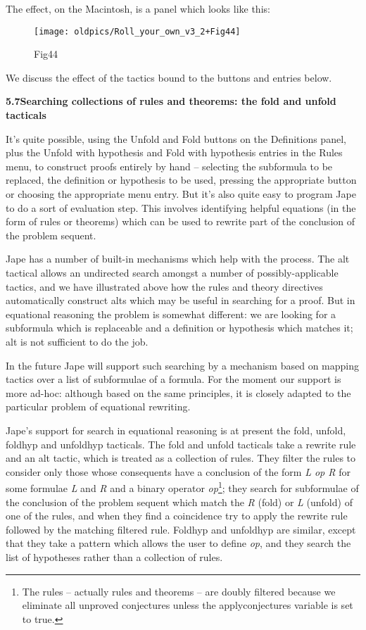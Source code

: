 \documentclass[11pt]{book}
\newcommand{\tab}{\hspace{5mm}}
\begin{document}
The effect, on the Macintosh, is a panel which looks like this:

\begin{figure}[htbp] \begin{center} \texttt{[image: oldpics/Roll\_your\_own\_v3\_2+Fig44]} \caption{Fig44} \end{center} \end{figure}


We discuss the effect of the tactics bound to the buttons and entries below.


\textbf{5.7\tab Searching collections of rules and theorems: the fold and unfold tacticals}


It's quite possible, using the Unfold and Fold buttons on the Definitions panel, plus the Unfold with hypothesis and Fold with hypothesis entries in the Rules menu, to construct proofs entirely by hand -- selecting the subformula to be replaced, the definition or hypothesis to be used, pressing the appropriate button or choosing the appropriate menu entry. But it's also quite easy to program Jape to do a sort of evaluation step. This involves identifying helpful equations (in the form of rules or theorems) which can be used to rewrite part of the conclusion of the problem sequent.


Jape has a number of built-in mechanisms which help with the process. The alt tactical allows an undirected search amongst a number of possibly-applicable tactics, and we have illustrated above how the rules and theory directives automatically construct alts which may be useful in searching for a proof. But in equational reasoning the problem is somewhat different: we are looking for a subformula which is replaceable and a definition or hypothesis which matches it; alt is not sufficient to do the job.


In the future Jape will support such searching by a mechanism based on mapping tactics over a list of subformulae of a formula. For the moment our support is more ad-hoc: although based on the same principles, it is closely adapted to the particular problem of equational rewriting.


Jape's support for search in equational reasoning is at present the fold, unfold, foldhyp and unfoldhyp tacticals. The fold and unfold tacticals take a rewrite rule and an alt tactic, which is treated as a collection of rules. They filter the rules to consider only those whose consequents have a conclusion of the form \textit{L op R} for some formulae \textit{L} and \textit{R} and a binary operator \textit{op}\footnote{The rules -- actually rules and theorems -- are doubly filtered because we eliminate all unproved conjectures unless the applyconjectures variable is set to true.}; they search for subformulae of the conclusion of the problem sequent which match the \textit{R} (fold) or \textit{L} (unfold) of one of the rules, and when they find a coincidence try to apply the rewrite rule followed by the matching filtered rule. Foldhyp and unfoldhyp are similar, except that they take a pattern which allows the user to define \textit{op}, and they search the list of hypotheses rather than a collection of rules.
\end{document}
